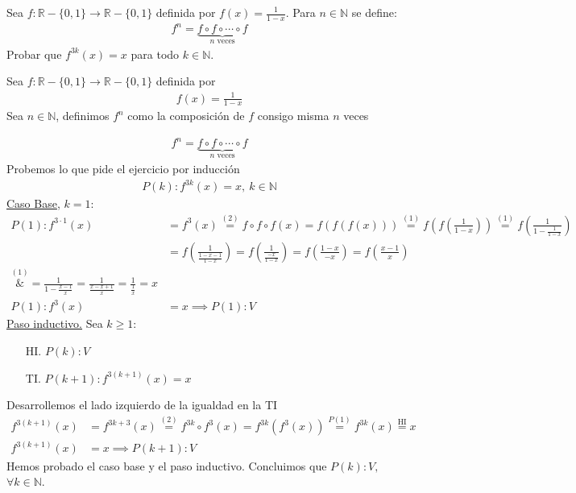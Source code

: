 \begin{enunciado}{\ejercicio}
    Sea $f:\mathbb{R}-\{0,1\}\rightarrow \mathbb{R}-\{0,1\}$ definida por $f(x) = \frac{1}{1-x}$. Para 
    $n \in \mathbb{N}$ se define:
    \begin{align*}
        f^n = \underbrace {f \circ f \circ \cdots \circ f}_\text{$n$ veces}
    \end{align*}
    Probar que $f^{3k}(x) = x$ para todo $k \in \mathbb{N}$.
\end{enunciado}
Sea $f:\mathbb{R}-\{0,1\}\rightarrow \mathbb{R}-\{0,1\}$ definida por
\setcounter{equation}{0}
\begin{align}
    f(x) = \frac{1}{1-x}
\end{align}
Sea $n \in \mathbb{N}$, definimos $f^n$ como la composición de $f$ consigo misma $n$ veces

\begin{align}
    f^n = \underbrace{f \circ f \circ \cdots \circ f}_\text{$n$ veces}
\end{align}
Probemos lo que pide el ejercicio por inducción
\begin{align*}
    P(k):f^{3k}(x) = x,\ k \in \mathbb{N}
\end{align*}
\underline{Caso Base}, $k = 1$:
\begin{align*}
    P(1): f^{3 \cdot 1}(x) &= f^3(x) \overset{(2)}{=} f \circ f \circ f(x) = f(f(f(x))) 
    \overset{(1)}{=} f \left(f\left(\frac{1}{1-x}\right)\right) 
    \overset{(1)}{=} f \left(\frac{1}{1 - \displaystyle \frac{1}{1-x} }\right) \\
    &= f \left(\frac{1}{\displaystyle \frac{1-x-1}{1-x}}\right)
    = f \left(\frac{1}{\displaystyle \frac{-x}{1-x}}\right) = f \left(\frac{1-x}{-x}\right) 
    = f \left(\frac{x-1}{x}\right) \\
    \overset{(1)}&{=} \frac{1}{1 - \displaystyle \frac{x-1}{x}} = \frac{1}{\displaystyle \frac{x-x+1}{x}}
    = \frac{1}{\displaystyle \frac{1}{x}} = x \\
    P(1): f^3(x) &= x \implies P(1):V
\end{align*}
\underline{Paso inductivo.} Sea $k \geq 1$:
\begin{enumerate}
    \item[HI.] $P(k): V$
    \item[TI.] $P(k+1): f^{3(k+1)}(x) = x$
\end{enumerate}
Desarrollemos el lado izquierdo de la igualdad en la TI
\begin{align*}
    f^{3(k+1)}(x) &= f^{3k+3}(x) \overset{(2)}{=} f^{3k} \circ f^3(x) = f^{3k}\left( f^3(x)\right)
    \overset{P(1)}{=} f^{3k}(x) \overset{\text{HI}}{=} x \\
    f^{3(k+1)}(x) &= x\implies P(k+1):V
\end{align*}
Hemos probado el caso base y el paso inductivo. Concluimos que $P(k):V,$ $\forall k \in \mathbb{N}$. \\

